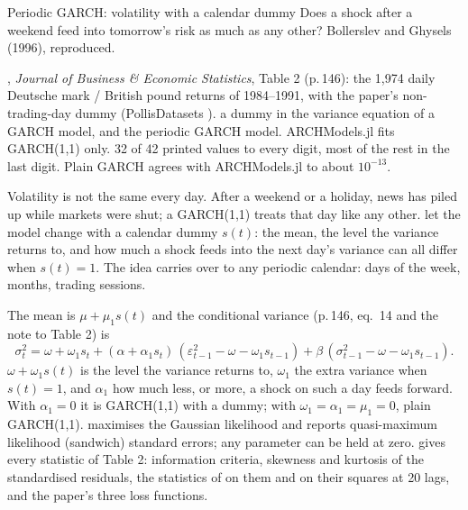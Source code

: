 



  {Periodic GARCH: volatility with a calendar dummy}
  {Does a shock after a weekend feed into tomorrow's risk as much as any other? Bollerslev and Ghysels (1996), reproduced.}

\factsheet
  {, \emph{Journal of Business \& Economic Statistics}, Table 2 (p.\,146): the 1,974 daily
   Deutsche mark / British pound returns of 1984--1991, with the paper's non-trading-day dummy (PollisDatasets ).}
  {a dummy in the variance equation of a GARCH model, and the periodic GARCH model. ARCHModels.jl fits GARCH(1,1) only.}
  {}
  {32 of 42 printed values to every digit, most of the rest in the last digit. Plain GARCH agrees with ARCHModels.jl to
   about $10^{-13}$.}

Volatility is not the same every day. After a weekend or a holiday, news has piled up while markets were shut; a
GARCH(1,1) treats that day like any other.  let the model change with a calendar dummy $s(t)$: the
mean, the level the variance returns to, and how much a shock feeds into the next day's variance can all differ when
$s(t) = 1$. The idea carries over to any periodic calendar: days of the week, months, trading sessions.

The mean is $\mu + \mu_1 s(t)$ and the conditional variance (p.\,146, eq.\ 14 and the note to Table 2) is
\[ \sigma^2_t = \omega + \omega_1 s_t + (\alpha + \alpha_1 s_t)\,(\varepsilon^2_{t-1} - \omega - \omega_1 s_{t-1})
   + \beta\,(\sigma^2_{t-1} - \omega - \omega_1 s_{t-1}). \]
$\omega + \omega_1 s(t)$ is the level the variance returns to, $\omega_1$ the extra variance when $s(t) = 1$, and $\alpha_1$
how much less, or more, a shock on such a day feeds forward. With $\alpha_1 = 0$ it is GARCH(1,1) with a dummy; with
$\omega_1 = \alpha_1 = \mu_1 = 0$, plain GARCH(1,1).  maximises the Gaussian likelihood and reports quasi-maximum
likelihood (sandwich) standard errors; any parameter can be held at zero.  gives every statistic of
Table 2: information criteria, skewness and kurtosis of the standardised residuals, the statistics of  on them and on
their squares at 20 lags, and the paper's three loss functions.


